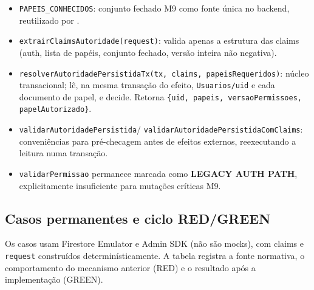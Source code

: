 \begin{itemize}
  \item \texttt{PAPEIS\_CONHECIDOS}: conjunto fechado M9 como fonte única no
  backend, reutilizado por .
  \item \texttt{extrairClaimsAutoridade(request)}: valida apenas a estrutura das
  claims (auth, lista de papéis, conjunto fechado, versão inteira não negativa).
  \item \texttt{resolverAutoridadePersistidaTx(tx, claims, papeisRequeridos)}:
  núcleo transacional; lê, na mesma transação do efeito, \texttt{Usuarios/uid} e
  cada documento de papel, e decide. Retorna
  \texttt{\{uid, papeis, versaoPermissoes, papelAutorizado\}}.
  \item \texttt{validarAutoridadePersistida}/
  \texttt{validarAutoridadePersistidaComClaims}: conveniências para pré-checagem
  antes de efeitos externos, reexecutando a leitura numa transação.
  \item \texttt{validarPermissao} permanece marcada como \textbf{LEGACY AUTH
  PATH}, explicitamente insuficiente para mutações críticas M9.
\end{itemize}

\subsection{Casos permanentes e ciclo RED/GREEN}

\begin{center}\small
{}
\end{center}

Os casos usam Firestore Emulator e Admin SDK (não são mocks), com claims e
\texttt{request} construídos determinísticamente. A tabela registra a fonte
normativa, o comportamento do mecanismo anterior (RED) e o resultado após a
implementação (GREEN).

